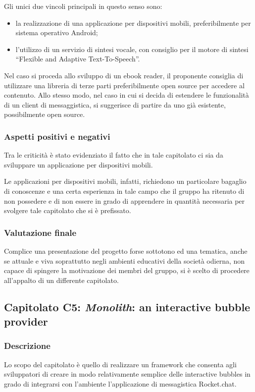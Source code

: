 			Gli unici due vincoli principali in questo senso sono:
			\begin{itemize}
			\item la realizzazione di una applicazione per dispositivi mobili, preferibilmente per sistema operativo Android;
			\item l'utilizzo di un servizio di sintesi vocale, con consiglio per il motore di sintesi “Flexible and Adaptive Text-To-Speech”.
			\end{itemize}
			Nel caso si proceda allo sviluppo di un ebook reader, il proponente consiglia di utilizzare una libreria di terze parti preferibilmente 
			open source per accedere al contenuto. Allo stesso modo, nel caso in cui si decida di estendere le funzionalità di un client di messaggistica, 
			si suggerisce di partire da uno già esistente, possibilmente open source.
		\subsubsection{Aspetti positivi e negativi}
		Tra le criticità è stato evidenziato il fatto che in tale capitolato ci sia da sviluppare un applicazione per dispositivi mobili.

		Le applicazioni per dispositivi mobili, infatti, richiedono un particolare bagaglio di conoscenze e una certa esperienza in tale campo che il gruppo ha ritenuto di non possedere e di non essere in grado di apprendere in quantità necessaria per svolgere tale capitolato che si è prefissato.
		
		\subsubsection{Valutazione finale}
		Complice una presentazione del progetto forse sottotono ed una tematica, anche se attuale e viva soprattutto negli ambienti educativi della società odierna, non capace di spingere la motivazione dei membri del gruppo, si è scelto di procedere all'appalto di un differente capitolato.
		
	\subsection{Capitolato C5: \emph{Monolith}: an interactive bubble provider}
		\subsubsection{Descrizione}
		Lo scopo del capitolato è quello di realizzare un framework che consenta agli sviluppatori di creare in modo relativamente semplice delle 
		interactive bubbles in grado di integrarsi con l'ambiente l'applicazione di messagistica Rocket.chat.

